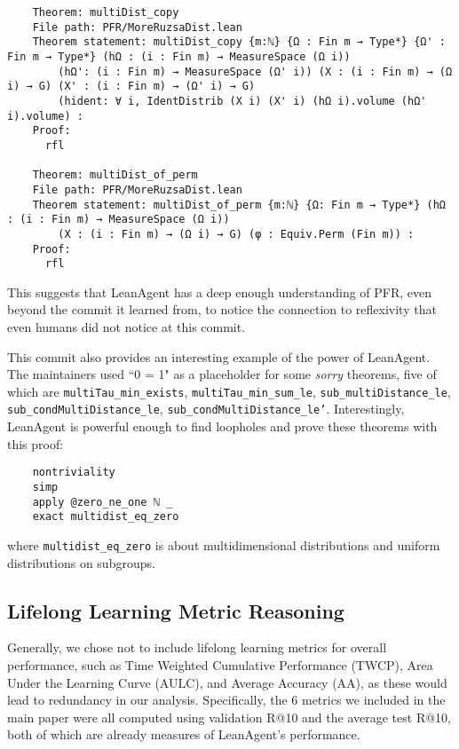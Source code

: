 \documentclass{article} %
\begin{document}
\begin{verbatim}
    Theorem: multiDist_copy
    File path: PFR/MoreRuzsaDist.lean
    Theorem statement: multiDist_copy {m:ℕ} {Ω : Fin m → Type*} {Ω' : Fin m → Type*} (hΩ : (i : Fin m) → MeasureSpace (Ω i))
        (hΩ': (i : Fin m) → MeasureSpace (Ω' i)) (X : (i : Fin m) → (Ω i) → G) (X' : (i : Fin m) → (Ω' i) → G)
        (hident: ∀ i, IdentDistrib (X i) (X' i) (hΩ i).volume (hΩ' i).volume) :
    Proof:
      rfl
    
    Theorem: multiDist_of_perm
    File path: PFR/MoreRuzsaDist.lean
    Theorem statement: multiDist_of_perm {m:ℕ} {Ω: Fin m → Type*} (hΩ : (i : Fin m) → MeasureSpace (Ω i))
        (X : (i : Fin m) → (Ω i) → G) (φ : Equiv.Perm (Fin m)) :
    Proof:
      rfl
\end{verbatim}

This suggests that LeanAgent has a deep enough understanding of PFR, even beyond the commit it learned from, to notice the connection to reflexivity that even humans did not notice at this commit.

This commit also provides an interesting example of the power of LeanAgent. The maintainers used ``0 = 1" as a placeholder for some \textit{sorry} theorems, five of which are \texttt{multiTau\_min\_exists}, \texttt{multiTau\_min\_sum\_le}, \texttt{sub\_multiDistance\_le}, \texttt{sub\_condMultiDistance\_le}, \texttt{sub\_condMultiDistance\_le'}. Interestingly, LeanAgent is powerful enough to find loopholes and prove these theorems with this proof:

\begin{verbatim}
    nontriviality
    simp
    apply @zero_ne_one ℕ _
    exact multidist_eq_zero
\end{verbatim}

where \texttt{multidist\_eq\_zero} is about multidimensional distributions and uniform distributions on subgroups.


\subsection{Lifelong Learning Metric Reasoning}

Generally, we chose not to include lifelong learning metrics for overall performance, such as Time Weighted Cumulative Performance (TWCP), Area Under the Learning Curve (AULC), and Average Accuracy (AA), as these would lead to redundancy in our analysis. Specifically, the 6 metrics we included in the main paper were all computed using validation R@10 and the average test R@10, both of which are already measures of LeanAgent's performance.
\end{document}
